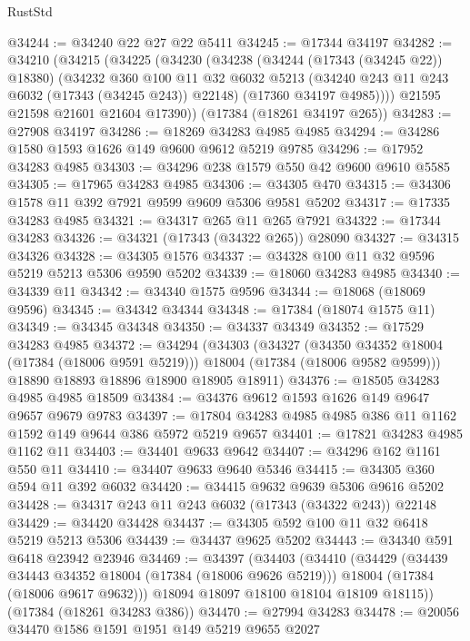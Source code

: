 \begin{lexlean}{RustStd}
\begin{coremodule}
@34244 := @34240 @22 @27 @22 @5411
@34245 := @17344 @34197
@34282 := @34210
    (@34215
      (@34225
        (@34230
          (@34238
            (@34244 (@17343 (@34245 @22)) @18380)
            (@34232
              @360
              @100
              @11
              @32
              @6032
              @5213
              (@34240 @243 @11 @243 @6032 (@17343 (@34245 @243)) @22148)
              (@17360 @34197 @4985))))
        @21595
        @21598
        @21601
        @21604
        @17390))
    (@17384 (@18261 @34197 @265))
@34283 := @27908 @34197
@34286 := @18269 @34283 @4985 @4985
@34294 := @34286 @1580 @1593 @1626 @149 @9600 @9612 @5219 @9785
@34296 := @17952 @34283 @4985
@34303 := @34296 @238 @1579 @550 @42 @9600 @9610 @5585
@34305 := @17965 @34283 @4985
@34306 := @34305 @470
@34315 := @34306 @1578 @11 @392 @7921 @9599 @9609 @5306 @9581 @5202
@34317 := @17335 @34283 @4985
@34321 := @34317 @265 @11 @265 @7921
@34322 := @17344 @34283
@34326 := @34321 (@17343 (@34322 @265)) @28090
@34327 := @34315 @34326
@34328 := @34305 @1576
@34337 := @34328 @100 @11 @32 @9596 @5219 @5213 @5306 @9590 @5202
@34339 := @18060 @34283 @4985
@34340 := @34339 @11
@34342 := @34340 @1575 @9596
@34344 := @18068 (@18069 @9596)
@34345 := @34342 @34344
@34348 := @17384 (@18074 @1575 @11)
@34349 := @34345 @34348
@34350 := @34337 @34349
@34352 := @17529 @34283 @4985
@34372 := @34294
    (@34303
      (@34327
        (@34350 @34352 @18004 (@17384 (@18006 @9591 @5219)))
        @18004
        (@17384 (@18006 @9582 @9599)))
      @18890
      @18893
      @18896
      @18900
      @18905
      @18911)
@34376 := @18505 @34283 @4985 @4985 @18509
@34384 := @34376 @9612 @1593 @1626 @149 @9647 @9657 @9679 @9783
@34397 := @17804 @34283 @4985 @4985 @386 @11 @1162 @1592 @149 @9644 @386 @5972 @5219 @9657
@34401 := @17821 @34283 @4985 @1162 @11
@34403 := @34401 @9633 @9642
@34407 := @34296 @162 @1161 @550 @11
@34410 := @34407 @9633 @9640 @5346
@34415 := @34305 @360 @594 @11 @392 @6032
@34420 := @34415 @9632 @9639 @5306 @9616 @5202
@34428 := @34317 @243 @11 @243 @6032 (@17343 (@34322 @243)) @22148
@34429 := @34420 @34428
@34437 := @34305 @592 @100 @11 @32 @6418 @5219 @5213 @5306
@34439 := @34437 @9625 @5202
@34443 := @34340 @591 @6418 @23942 @23946
@34469 := @34397
    (@34403
      (@34410
        (@34429
          (@34439 @34443 @34352 @18004 (@17384 (@18006 @9626 @5219)))
          @18004
          (@17384 (@18006 @9617 @9632)))
        @18094
        @18097
        @18100
        @18104
        @18109
        @18115))
    (@17384 (@18261 @34283 @386))
@34470 := @27994 @34283
@34478 := @20056 @34470 @1586 @1591 @1951 @149 @5219 @9655 @2027

\end{coremodule}
\end{lexlean}

